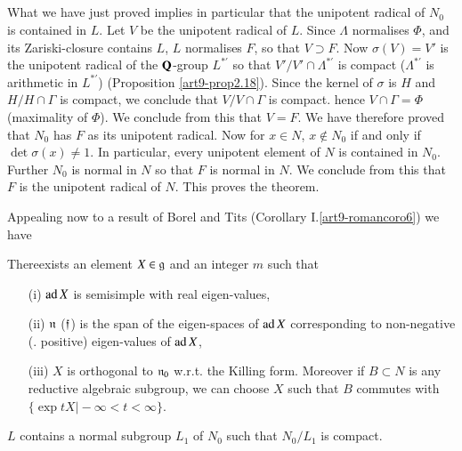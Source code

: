 \subsection{}\label{art9-subsec2.45}
What we have just proved implies in particular that the unipotent radical of $N_0$ is contained in $L$. Let $V$ be the unipotent radical of $L$. Since $\Lambda$ normalises $\Phi$, and its  Zariski-closure contains $L$, $L$ normalises $F$, so that $V \supset F$. Now $\sigma (V) = V'$ is the unipotent radical of the $\mathbf{Q}$-group $L^{\ast'}$ so that $V'/V' \cap \Lambda^{\ast'}$ is compact ($\Lambda^{\ast'}$ is arithmetic in $L^{\ast'}$) (Proposition \ref{art9-prop2.18}). Since the kernel of $\sigma$ is $H$ and $H/H \cap \Gamma$ is compact, we conclude that $V/V \cap \Gamma$ is compact. hence $V \cap \Gamma = \Phi$ (maximality of $\Phi$). We conclude from this that $V = F$. We have therefore proved that $N_0$ has $F$ as its unipotent radical. Now for $x \in N$, $x \not\in N_0$ if and only if $\det \sigma (x) \neq 1$. In particular, every unipotent element of $N$ is contained in $N_0$. Further $N_0$ is normal in $N$ so that $F$ is normal in $N$. We conclude from this that $F$ is the unipotent radical of $N$. This proves the theorem.

Appealing now to a result of Borel and Tits (Corollary I.\ref{art9-romancoro6}) we have 

\setcounter{definition}{45}
\begin{corollary}\label{art9-subsec2.46}
There\pageoriginale exists an element $X \in \mathfrak{g}$ and an integer $m$ such that 
\begin{itemize}
\item[(i)] $\operatorname{ad} X$ is semisimple with real eigen-values,

\item[(ii)] $\mathfrak{n}$ (\resp $\mathfrak{f}$) is the span of the eigen-spaces of $\operatorname{ad} X$ corresponding to non-negative (\resp. positive) eigen-values of $\operatorname{ad} X$,

\item[(iii)] $X$ is orthogonal to $\mathfrak{n}_0$ w.r.t. the Killing form. Moreover if $B \subset N$ is any reductive algebraic subgroup, we can choose $X$ such that $B$ commutes with $\{\exp t X \big| - \infty < t < \infty \}$.
\end{itemize}
\end{corollary}

\begin{corollary}\label{art9-coro2.47}
$L$ contains a normal subgroup $L_1$ of $N_0$ such that $N_0/ L_1$ is compact.
\end{corollary}

